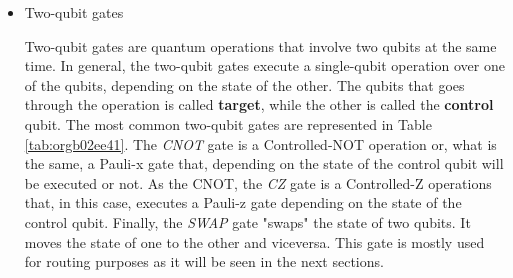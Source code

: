 \begin{itemize}
\begin{itemize}
The \emph{Identity} gate is the idling operation.
It is equivalent to no applying any operation for a cycle.
The \emph{Pauli-x, -y and -z} gates are 180° rotation over the x-, y- and z-axis respectively.
Eg. a qubit with state \(|+\rangle\) that is equivalent to the position \(\theta = \frac{\pi}{2}, \phi = 0\) in the Bloch sphere is rotated in the y-axis with a Pauli-y gate, \(Y|+\rangle = \frac{i}{\sqrt{2}} \begin{bmatrix}-1 \\ 1 \end{bmatrix}\).
This resulting state is located in \(\theta = \frac{\pi}{2}, \phi = \pi\), that is a 180° rotation in the Y axis.
The \emph{Hadamard} gate is also a 180° rotation, but over the diagonal axis between the x- and z-axes, \(\frac{({\hat {x}}+{\hat {z}})}{\sqrt {2}}}\).
The \emph{S} and \emph{T} gates are also rotations over the z-axis but of 90° and 45° respectively.


\item Two-qubit gates
\label{sec:org62782a5}

Two-qubit gates are quantum operations that involve two qubits at the same time.
In general, the two-qubit gates execute a single-qubit operation over one of the qubits, depending on the state of the other.
The qubits that goes through the operation is called \textbf{target}, while the other is called the \textbf{control} qubit.
The most common two-qubit gates are represented in Table \ref{tab:orgb02ee41}.
The \emph{CNOT} gate is a Controlled-NOT operation or, what is the same, a Pauli-x gate that, depending on the state of the control qubit will be executed or not.
As the CNOT, the \emph{CZ} gate is a Controlled-Z operations that, in this case, executes a Pauli-z gate depending on the state of the control qubit.
Finally, the \emph{SWAP} gate "swaps" the state of two qubits.
It moves the state of one to the other and viceversa.
This gate is mostly used for routing purposes as it will be seen in the next sections.


\end{itemize}
\end{itemize}
